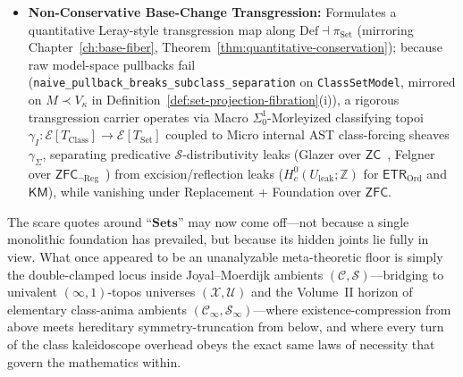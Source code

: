 \begin{itemize}[leftmargin=1.5em]
  \item \textbf{Non-Conservative Base-Change Transgression:} Formulates a quantitative Leray-style transgression map along $\mathrm{Def} \dashv \pi_{\mathrm{Set}}$ (mirroring Chapter~\ref{ch:base-fiber}, Theorem~\ref{thm:quantitative-conservation}); because raw model-space pullbacks fail (\texttt{naive\_pullback\_breaks\_subclass\_separation} on \texttt{ClassSetModel}, mirrored on $M \prec V_\kappa$ in Definition~\ref{def:set-projection-fibration}(i)), a rigorous transgression carrier operates via Macro $\Sigma^1_0$-Morleyized classifying topoi $\gamma_I : \mathcal{E}[T_{\mathrm{Class}}] \to \mathcal{E}[T_{\mathrm{Set}}]$ coupled to Micro internal AST class-forcing sheaves $\gamma_\Sigma$, separating predicative $\mathcal{S}$-distributivity leaks (Glazer over $\mathsf{ZC}$~\cite{Glazer23}, Felgner over $\mathsf{ZFC}_{\neg\mathrm{Reg}}$~\cite{Felgner76}) from excision/reflection leaks ($H^0_c(U_{\mathrm{leak}}; \mathbb{Z})$ for $\mathsf{ETR}_{\mathrm{Ord}}$ and $\mathsf{KM}$), while vanishing under Replacement + Foundation over $\mathsf{ZFC}$.
\end{itemize}

The scare quotes around ``$\mathbf{Sets}$'' may now come off---not because a single monolithic foundation has prevailed, but because its hidden joints lie fully in view. What once appeared to be an unanalyzable meta-theoretic floor is simply the double-clamped locus inside Joyal--Moerdijk ambients $(\mathcal{C}, \mathcal{S})$---bridging to univalent $(\infty, 1)$-topos universes $(\mathcal{X}, \mathcal{U})$ and the Volume~II horizon of elementary class-anima ambients $(\mathcal{C}_\infty, \mathcal{S}_\infty)$---where existence-compression from above meets hereditary symmetry-truncation from below, and where every turn of the class kaleidoscope overhead obeys the exact same laws of necessity that govern the mathematics within.
